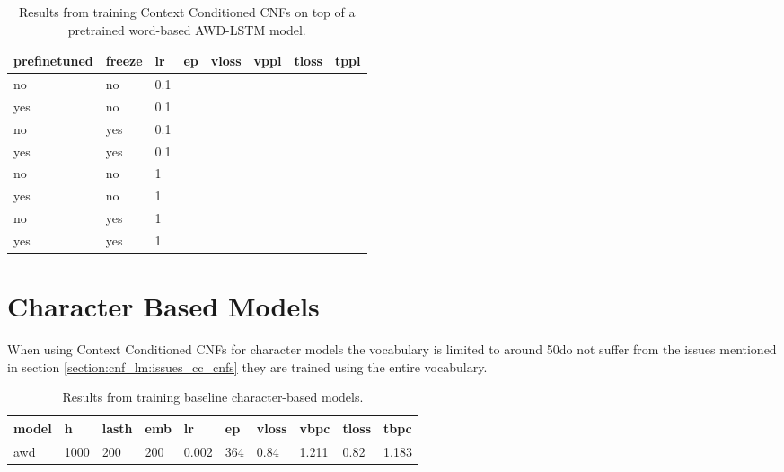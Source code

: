 \begin{table}[]
\centering
\caption{Results from training Context Conditioned CNFs on top of a pretrained word-based AWD-LSTM model.}
\begin{tabular}{|l|l|l|l|l|l|l|l|}
\hline
\textbf{prefinetuned} & \textbf{freeze} & \textbf{lr} & \textbf{ep} & \textbf{vloss} & \textbf{vppl} & \textbf{tloss} & \textbf{tppl} \\ \hline
no           & no     & 0.1 &    &       &      &       &      \\ \hline
yes          & no     & 0.1 &    &       &      &       &      \\ \hline
no           & yes    & 0.1 &    &       &      &       &      \\ \hline
yes          & yes    & 0.1 &    &       &      &       &      \\ \hline
no           & no     & 1   &    &       &      &       &      \\ \hline
yes          & no     & 1   &    &       &      &       &      \\ \hline
no           & yes    & 1   &    &       &      &       &      \\ \hline
yes          & yes    & 1   &    &       &      &       &      \\ \hline
\end{tabular}
\end{table}

\section{Character Based Models}

When using Context Conditioned CNFs for character models the vocabulary is limited to around 50do not suffer from the issues mentioned in section \ref{section:cnf_lm:issues_cc_cnfs} they are trained using the entire vocabulary.

\begin{table}[]
\centering
\caption{Results from training baseline character-based models.}
\begin{tabular}{|l|l|l|l|l|l|l|l|l|l|}
\hline
\textbf{model} & \textbf{h} & \textbf{lasth} & \textbf{emb} & \textbf{lr} & \textbf{ep} & \textbf{vloss} & \textbf{vbpc} & \textbf{tloss} & \textbf{tbpc} \\ \hline
awd       & 1000       & 200            & 200          & 0.002       & 364         & 0.84           & 1.211         & 0.82           & 1.183         \\ \hline
\end{tabular}
\end{table}


